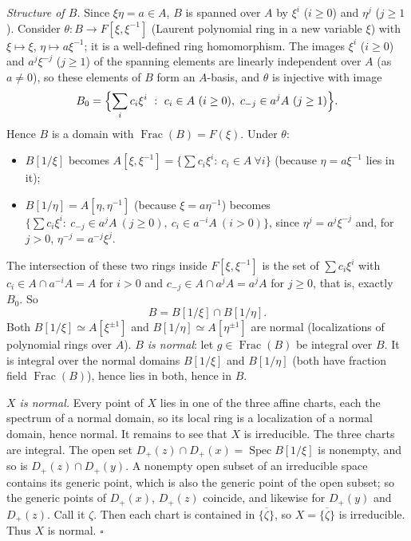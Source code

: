 \documentclass[11pt]{article}
\begin{document}
\emph{Structure of $B$.} Since $\xi\eta=a\in A$, $B$ is spanned over $A$ by $\xi^i$ ($i\ge0$) and $\eta^j$ ($j\ge1$). Consider $\theta:B\to F[\xi,\xi^{-1}]$ (Laurent polynomial ring in a new variable $\xi$) with $\xi\mapsto\xi$, $\eta\mapsto a\xi^{-1}$; it is a well-defined ring homomorphism. The images $\xi^i$ ($i\ge0$) and $a^j\xi^{-j}$ ($j\ge1$) of the spanning elements are linearly independent over $A$ (as $a\ne0$), so these elements of $B$ form an $A$-basis, and $\theta$ is injective with image
\[ B_0=\Bigl\{\sum_ic_i\xi^i\ :\ c_i\in A\ (i\ge0),\ c_{-j}\in a^jA\ (j\ge1)\Bigr\}. \]
Hence $B$ is a domain with $\operatorname{Frac}(B)=F(\xi)$. Under $\theta$:
\begin{itemize}
\item $B[1/\xi]$ becomes $A[\xi,\xi^{-1}]=\{\sum c_i\xi^i:\ c_i\in A\ \forall i\}$ (because $\eta=a\xi^{-1}$ lies in it);
\item $B[1/\eta]=A[\eta,\eta^{-1}]$ (because $\xi=a\eta^{-1}$) becomes $\{\sum c_i\xi^i:\ c_{-j}\in a^jA\ (j\ge0),\ c_i\in a^{-i}A\ (i>0)\}$, since $\eta^j=a^j\xi^{-j}$ and, for $j>0$, $\eta^{-j}=a^{-j}\xi^j$.
\end{itemize}
The intersection of these two rings inside $F[\xi,\xi^{-1}]$ is the set of $\sum c_i\xi^i$ with $c_i\in A\cap a^{-i}A=A$ for $i>0$ and $c_{-j}\in A\cap a^jA=a^jA$ for $j\ge0$, that is, exactly $B_0$. So
\[ B=B[1/\xi]\cap B[1/\eta]. \]
Both $B[1/\xi]\simeq A[\xi^{\pm1}]$ and $B[1/\eta]\simeq A[\eta^{\pm1}]$ are normal (localizations of polynomial rings over $A$). \emph{$B$ is normal}: let $g\in\operatorname{Frac}(B)$ be integral over $B$. It is integral over the normal domains $B[1/\xi]$ and $B[1/\eta]$ (both have fraction field $\operatorname{Frac}(B)$), hence lies in both, hence in $B$.

\emph{$X$ is normal.} Every point of $X$ lies in one of the three affine charts, each the spectrum of a normal domain, so its local ring is a localization of a normal domain, hence normal. It remains to see that $X$ is irreducible. The three charts are integral. The open set $D_+(z)\cap D_+(x)=\operatorname{Spec}B[1/\xi]$ is nonempty, and so is $D_+(z)\cap D_+(y)$. A nonempty open subset of an irreducible space contains its generic point, which is also the generic point of the open subset; so the generic points of $D_+(x)$, $D_+(z)$ coincide, and likewise for $D_+(y)$ and $D_+(z)$. Call it $\zeta$. Then each chart is contained in $\overline{\{\zeta\}}$, so $X=\overline{\{\zeta\}}$ is irreducible. Thus $X$ is normal. \hfill$\square$
\end{document}
